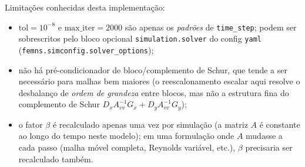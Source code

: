 \documentclass[11pt,a4paper]{article}
\begin{document}
Limitações conhecidas desta implementação:
\begin{itemize}
  \item $\text{tol}=10^{-8}$ e $\text{max\_iter}=2000$ são apenas os
    \emph{padrões} de \texttt{time\_step}; podem ser sobrescritos pelo
    bloco opcional \texttt{simulation.solver} do config \texttt{yaml}
    (\texttt{femns.simconfig.solver\_options});
  \item não há pré-condicionador de bloco/complemento de Schur, que
    tende a ser necessário para malhas bem maiores (o reescalonamento
    escalar aqui resolve o desbalanço de \emph{ordem de grandeza} entre
    blocos, mas não a estrutura fina do complemento de Schur $D_x
    A_{vv}^{-1} G_x + D_y A_{vv}^{-1} G_y$);
  \item o fator $\beta$ é recalculado apenas uma vez por simulação (a
    matriz $A$ é constante ao longo do tempo neste modelo); em uma
    formulação onde $A$ mudasse a cada passo (malha móvel completa,
    Reynolds variável, etc.), $\beta$ precisaria ser recalculado
    também.
\end{itemize}
\end{document}
